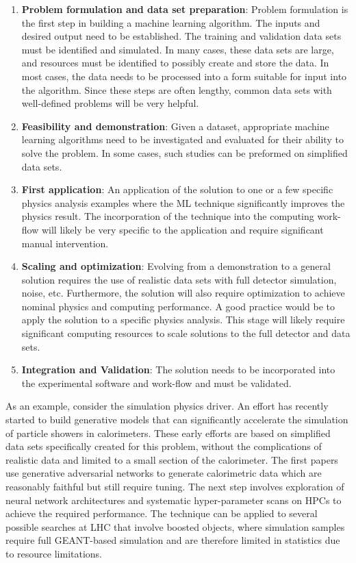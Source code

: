 \begin{enumerate}
 \item \textbf{Problem formulation and data set preparation}: Problem formulation is the first step in building a machine learning algorithm. The inputs and desired output need to be established. The training and validation data sets must be identified and simulated. In many cases, these data sets are large, and resources must be identified to possibly create and store the data. In most cases, the data needs to be processed into a form suitable for input into the algorithm. Since these steps are often lengthy, common data sets with well-defined problems will be very helpful.
 \item \textbf{Feasibility and demonstration}: Given a dataset, appropriate machine learning algorithms need to be investigated and evaluated for their ability to solve the problem. In some cases, such studies can be preformed on simplified data sets.
 \item \textbf{First application}: An application of the solution to one or a few specific physics analysis examples where the ML technique significantly improves the physics result. The incorporation of the technique into the computing work-flow will likely be very specific to the application and require significant manual intervention.
 \item \textbf{Scaling and optimization}: Evolving from a demonstration to a general solution requires the use of realistic data sets with full detector simulation, noise, etc. Furthermore, the solution will also require optimization to achieve nominal physics and computing performance. A good practice would be to apply the solution to a specific physics analysis. This stage will likely require significant computing resources to scale solutions to the full detector and data sets.
 \item \textbf{Integration and Validation}: The solution needs to be incorporated into the experimental software and work-flow and must be validated.
\end{enumerate}

As an example, consider the simulation physics driver. An effort has recently started to build generative models that can significantly accelerate the simulation of particle showers in calorimeters.
These early efforts are based on simplified data sets specifically created for this problem, without the complications of realistic data and limited to a small section of the calorimeter.
The first papers~\cite{Paganini:2017hrr} use generative adversarial networks to generate calorimetric data which are reasonably faithful but still require tuning. The next step involves exploration of neural network architectures and systematic hyper-parameter scans on HPCs to achieve the required performance.
The technique can be applied to several possible searches at LHC that involve boosted objects, where simulation samples require full GEANT-based simulation and are therefore limited in statistics due to resource limitations.\\

